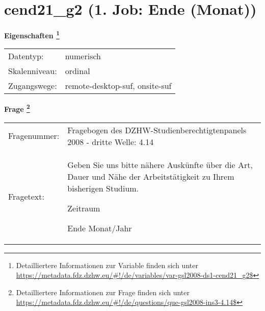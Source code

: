 
    \setcounter{footnote}{0}

    \vspace*{-1.8cm}
	\section{cend21\_g2 (1. Job: Ende (Monat))}
	\label{section:cend21_g2}



    \vspace*{0.5cm}
    \noindent\textbf{Eigenschaften
	\footnote{Detailliertere Informationen zur Variable finden sich unter
		\url{https://metadata.fdz.dzhw.eu/\#!/de/variables/var-gsl2008-ds1-cend21_g2$}}}\\
	\begin{tabularx}{\hsize}{@{}lX}
	Datentyp: & numerisch \\
	Skalenniveau: & ordinal \\
	Zugangswege: &
	  remote-desktop-suf, 
	  onsite-suf
 \\
    \end{tabularx}



				\vspace*{0.5cm}
                \noindent\textbf{Frage
	                \footnote{Detailliertere Informationen zur Frage finden sich unter
		              \url{https://metadata.fdz.dzhw.eu/\#!/de/questions/que-gsl2008-ins3-4.14$}}}\\
				\begin{tabularx}{\hsize}{@{}lX}
					Fragenummer: &
					  Fragebogen des DZHW-Studienberechtigtenpanels 2008 - dritte Welle:
					  4.14
 \\
					Fragetext: & Geben Sie uns bitte nähere Auskünfte über die Art, Dauer und Nähe der Arbeitstätigkeit zu Ihrem bisherigen Studium.\par  Zeitraum\par  Ende Monat/Jahr \\
				\end{tabularx}





